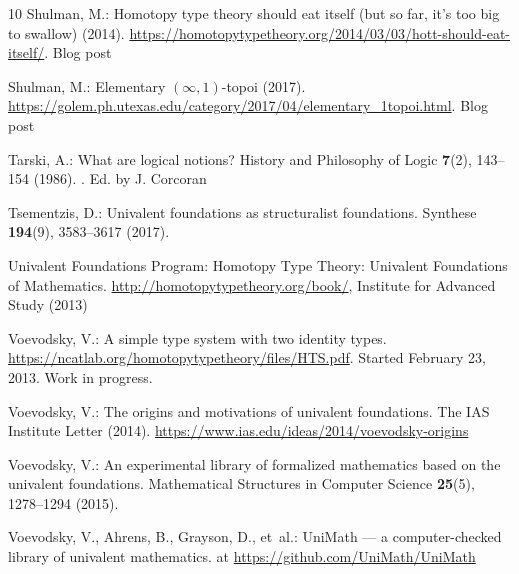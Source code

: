 \documentclass[12pt]{article}
\begin{document}
\begin{thebibliography}{10}
Shulman, M.: Homotopy type theory should eat itself (but so far, it’s too big
  to swallow) (2014).
\newblock
  \urlprefix\url{https://homotopytypetheory.org/2014/03/03/hott-should-eat-itself/}.
\newblock Blog post

Shulman, M.: Elementary {$(\infty,1)$}-topoi (2017).
\newblock
  \urlprefix\url{https://golem.ph.utexas.edu/category/2017/04/elementary_1topoi.html}.
\newblock Blog post

Tarski, A.: What are logical notions?
\newblock History and Philosophy of Logic \textbf{7}(2), 143--154 (1986).
\newblock {}.
\newblock Ed. by J. Corcoran

Tsementzis, D.: Univalent foundations as structuralist foundations.
\newblock Synthese \textbf{194}(9), 3583–3617 (2017).
\newblock {}

{Univalent Foundations Program}: Homotopy Type Theory: Univalent Foundations of
  Mathematics.
\newblock \url{http://homotopytypetheory.org/book/}, Institute for Advanced
  Study (2013)

Voevodsky, V.: A simple type system with two identity types.
\newblock \urlprefix\url{https://ncatlab.org/homotopytypetheory/files/HTS.pdf}.
\newblock Started February 23, 2013. Work in progress.

Voevodsky, V.: The origins and motivations of univalent foundations.
\newblock The IAS Institute Letter  (2014).
\newblock \urlprefix\url{https://www.ias.edu/ideas/2014/voevodsky-origins}

Voevodsky, V.: An experimental library of formalized mathematics based on the
  univalent foundations.
\newblock Mathematical Structures in Computer Science \textbf{25}(5),
  1278–1294 (2015).
\newblock {}

Voevodsky, V., Ahrens, B., Grayson, D., et~al.: {UniMath --- a computer-checked
  library of univalent mathematics}.
 at \url{https://github.com/UniMath/UniMath}

\end{thebibliography}
\end{document}
